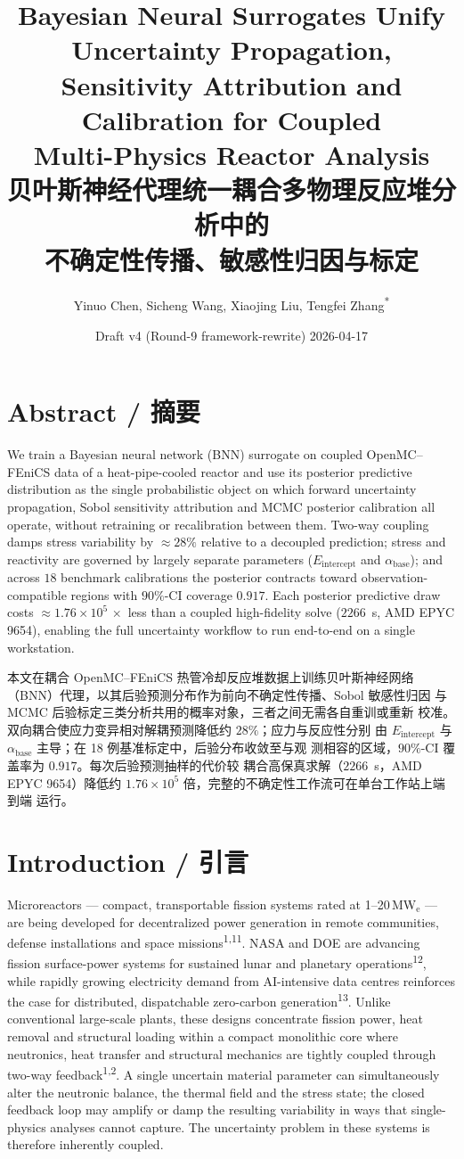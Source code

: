 \documentclass[11pt,a4paper]{article}
\title{\textbf{Bayesian Neural Surrogates Unify Uncertainty Propagation,\\
Sensitivity Attribution and Calibration for Coupled\\
Multi-Physics Reactor Analysis}\\[0.4em]
\large 贝叶斯神经代理统一耦合多物理反应堆分析中的\\
不确定性传播、敏感性归因与标定}
\author{Yinuo Chen, Sicheng Wang, Xiaojing Liu, Tengfei Zhang\textsuperscript{*}}
\date{Draft v4 (Round-9 framework-rewrite) \textperiodcentered{} 2026-04-17}
\newcommand{\abase}{\ensuremath{\alpha_{\mathrm{base}}}}
\newcommand{\Eint}{\ensuremath{E_{\mathrm{intercept}}}}
\begin{document}
\maketitle

\section*{Abstract / 摘要}

We train a Bayesian neural network (BNN) surrogate on coupled
OpenMC--FEniCS data of a heat-pipe-cooled reactor and use its posterior
predictive distribution as the single probabilistic object on which
forward uncertainty propagation, Sobol sensitivity attribution and MCMC
posterior calibration all operate, without retraining or recalibration
between them. Two-way coupling damps stress variability by
$\approx 28\%$ relative to a decoupled prediction; stress and
reactivity are governed by largely separate parameters (\Eint{} and
\abase{}); and across $18$ benchmark calibrations the posterior
contracts toward observation-compatible regions with $90\%$-CI coverage
$0.917$. Each posterior predictive draw costs
$\approx 1.76\times 10^{5}\,\times$ less than a coupled high-fidelity
solve ($2266$~s, AMD EPYC 9654), enabling the full uncertainty workflow
to run end-to-end on a single workstation.

本文在耦合 OpenMC--FEniCS 热管冷却反应堆数据上训练贝叶斯神经网络
（BNN）代理，以其后验预测分布作为前向不确定性传播、Sobol 敏感性归因
与 MCMC 后验标定三类分析共用的概率对象，三者之间无需各自重训或重新
校准。双向耦合使应力变异相对解耦预测降低约 $28\%$；应力与反应性分别
由 \Eint{} 与 \abase{} 主导；在 18 例基准标定中，后验分布收敛至与观
测相容的区域，$90\%$-CI 覆盖率为 $0.917$。每次后验预测抽样的代价较
耦合高保真求解（$2266$~s，AMD EPYC 9654）降低约
$1.76\times 10^{5}$ 倍，完整的不确定性工作流可在单台工作站上端到端
运行。

\section{Introduction / 引言}

Microreactors --- compact, transportable fission systems rated at
1--20\,MW$_\mathrm{e}$ --- are being developed for decentralized power
generation in remote communities, defense installations and space
missions\textsuperscript{1,11}. NASA and DOE are advancing fission
surface-power systems for sustained lunar and planetary
operations\textsuperscript{12}, while rapidly growing electricity demand
from AI-intensive data centres reinforces the case for distributed,
dispatchable zero-carbon generation\textsuperscript{13}. Unlike
conventional large-scale plants, these designs concentrate fission power,
heat removal and structural loading within a compact monolithic core
where neutronics, heat transfer and structural mechanics are tightly
coupled through two-way feedback\textsuperscript{1,2}. A single
uncertain material parameter can simultaneously alter the neutronic
balance, the thermal field and the stress state; the closed feedback
loop may amplify or damp the resulting variability in ways that
single-physics analyses cannot capture. The uncertainty problem in these
systems is therefore inherently coupled.
\end{document}
